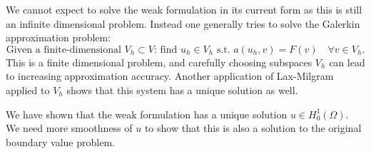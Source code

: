 \documentclass[thesis.tex]{subfiles}
\begin{document}
We cannot expect to solve the weak formulation in its current form as this is still an infinite dimensional problem. Instead one generally tries to solve the Galerkin approximation problem:
\begin{equation}
  \label{eq:galerk_finite}
  \text{Given a finite-dimensional } V_h \subset V \text{: find $u_h \in V_h$ s.t. } a(u_h, v) = F(v) \quad \forall v \in V_h.
\end{equation}
This is a finite dimensional problem, and carefully choosing subspaces $V_h$ can lead to increasing approximation accuracy. Another application of Lax-Milgram applied to $V_h$ shows that this system has a unique solution as well.

\begin{rem}
  We have shown that the weak formulation has a unique solution $u \in H_0^1(\Omega)$. We need more smoothness of $u$ to show that this is also a solution to the original boundary value problem.
\end{rem}
\end{document}
